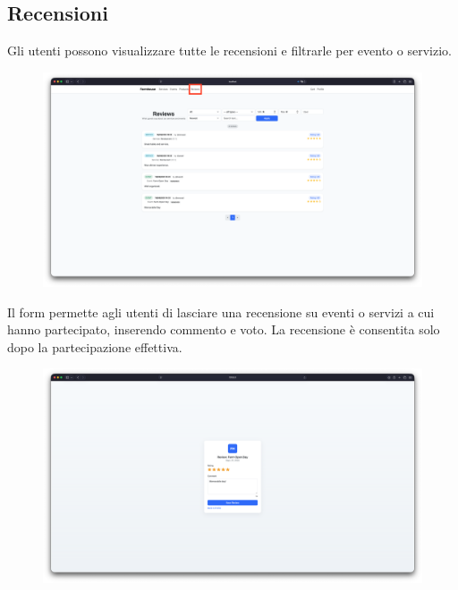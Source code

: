 \documentclass[a4paper,12pt]{report}
\begin{document}
\subsection*{Recensioni}
Gli utenti possono visualizzare tutte le recensioni e filtrarle per
evento o servizio.

\begin{figure}[H]
  \centering
  \includegraphics[width=\textwidth, trim=0 0 0 0]{./img/users/reviews.png}
  \vspace{-1em}
  \label{fig:recensione}
\end{figure}

Il form permette agli utenti di lasciare una recensione su eventi o
servizi a cui hanno partecipato,
inserendo commento e voto. La recensione è consentita solo dopo la
partecipazione effettiva.

\begin{figure}[H]
  \centering
  \includegraphics[width=\textwidth, trim=0 0 0 0]{./img/users/give_review.png}
  \vspace{-1em}
  \label{fig:lascia recensione}
\end{figure}
\end{document}
